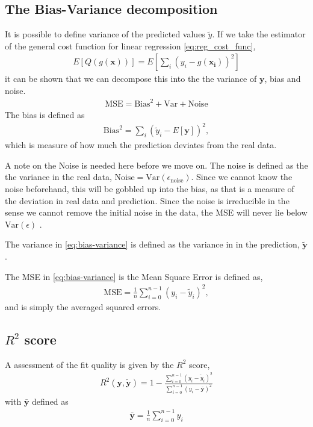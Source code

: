 \documentclass[11pt]{article}
\begin{document}
\subsection{The Bias-Variance decomposition}
It is possible to define variance of the predicted values $\tilde{y}$. If we take the estimator of the general cost function for linear regression \eqref{eq:reg_cost_func},
\begin{align*}
    E[Q(g(\bm{x}))] = E\left[\sum_i (y_i - g(\bm{x_i}))^2 \right]
\end{align*}
it can be shown that we can decompose this into the the variance of $\bm{y}$, bias and noise\cite{2018arXiv180308823M,morten-regression}.
\begin{align}
    \text{MSE} = \text{Bias}^2 + \text{Var} + \text{Noise}
    \label{eq:bias-variance}
\end{align}
The bias is defined as
\begin{align}
    \mathrm{Bias}^2 = \sum_i (\tilde{y}_i - E[\bm{y}])^2,
    \label{eq:bias}
\end{align}
which is measure of how much the prediction deviates from the real data.

A note on the Noise is needed here before we move on. The noise is defined as the the variance in the real data, $\text{Noise}=\text{Var}(\epsilon_\mathrm{noise})$. Since we cannot know the noise beforehand, this will be gobbled up into the bias, as that is a measure of the deviation in real data and prediction. Since the noise is irreducible in the sense we cannot remove the initial noise in the data, the MSE will never lie below $\text{Var}(\epsilon)$ \citep[ch. 2, p. 34]{james2013introduction}.

The variance in \eqref{eq:bias-variance} is defined as the variance in in the prediction, $\tilde{\bm{y}}$.

The MSE in \eqref{eq:bias-variance} is the Mean Square Error is defined as,
\begin{align}
    \text{MSE} = \frac{1}{n} \sum^{n-1}_{i=0}(y_i - \tilde{y}_i)^2,
    \label{eq:mse}
\end{align}
and is simply the averaged squared errors.

\subsection{\texorpdfstring{$R^2$}{R1} score}
A assessment of the fit quality is given by the $R^2$ score,
\begin{align}
    R^2(\bm{y},\tilde{\bm{y}}) = 1 - \frac{\sum_{i=0}^{n-1}(y_i - \tilde{y}_i)^2}{\sum_{i=0}^{n-1}(y_i - \bar{\bm{y}})^2}
    \label{eq:r2_score}
\end{align}
with $\bar{\bm{y}}$ defined as 
\begin{align*}
    \bar{\bm{y}} = \frac{1}{n}\sum^{n-1}_{i=0} y_i
\end{align*}
\end{document}
